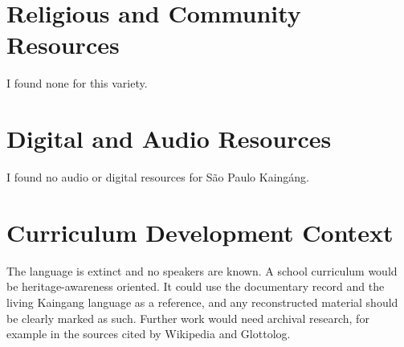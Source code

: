 \documentclass[12pt]{article}
\begin{document}
\section{Religious and Community Resources}
I found none for this variety.

\section{Digital and Audio Resources}
I found no audio or digital resources for S\~ao Paulo Kaing\'ang.

\section{Curriculum Development Context}
The language is extinct and no speakers are known. A school curriculum would be heritage-awareness oriented. It could use the documentary record and the living Kaingang language as a reference, and any reconstructed material should be clearly marked as such. Further work would need archival research, for example in the sources cited by Wikipedia and Glottolog.
\end{document}
